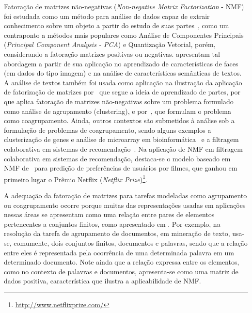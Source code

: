 \documentclass[
    12pt,                %
    oneside,            %
    a4paper,            %
    english,            %
    brazil                %
    ]{abntex2ppgsi}
\begin{document}
Fatoração de matrizes não-negativas (\textit{Non-negative Matrix Factorization} - NMF) foi estudada como um método para análise de dados capaz de extrair conhecimento sobre um objeto a partir do estudo de suas partes~\cite{lee99}, como um contraponto a métodos mais populares como Análise de Componentes Principais (\textit{Principal Component Analysis - PCA}) e Quantização Vetorial, porém, considerando a fatoração matrizes positivas ou negativas.
 apresentam tal abordagem a partir de sua aplicação no aprendizado de características de faces (em dados do tipo imagem) e na análise de características semânticas de textos.
A análise de textos também foi usada como aplicação na ilustração da aplicação de fatorização de matrizes por~ que segue a ideia de aprendizado de partes, por~ que aplica fatoração de matrizes não-negativas sobre um problema formulado como análise de agrupamento (clustering), e por~, que formulam o problema como coagrupamento.
Ainda, outros contextos são submetidos à análise sob a formulação de problemas de coagrupamento, sendo alguns exemplos a clusterização de genes e análise de microarray em bioinformática~\cite{Kluger2003} e a filtragem colaborativa em sistemas de recomendação~\cite{SalMnih08}.
Na aplicação de NMF em filtragem colaborativa em sistemas de recomendação, destaca-se o modelo baseado em NMF de~ para predição de preferências de usuários por filmes, que ganhou em primeiro lugar o Prêmio Netflix (\textit{Netflix Prize})\footnote{\url{http://www.netflixprize.com/}}.

A adequação da fatoração de matrizes para tarefas modeladas como agrupamento ou coagrupamento ocorre porque muitas das representações usadas em aplicações nessas áreas se apresentam como uma relação entre pares de elementos pertencentes a conjuntos finitos, como apresentado em \cite{Long2005}. Por exemplo, na resolução da tarefa de agrupamento de documentos, em mineração de texto, usa-se, comumente, dois conjuntos finitos, documentos e palavras, sendo que a relação entre eles é representada pela ocorrência de uma determinada palavra em um determinado documento. Note ainda que a relação expressa entre os elementos, como no contexto de palavras e documentos, apresenta-se como uma matriz de dados positiva, característica que ilustra a aplicabilidade de NMF.
\end{document}
